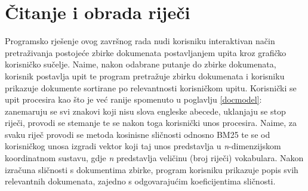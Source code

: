 \documentclass[times, utf8, zavrsni]{fer}
\begin{document}
\section{Čitanje i obrada riječi}
Programsko rješenje ovog završnog rada nudi korisniku interaktivan način pretraživanja postojeće zbirke dokumenata postavljanjem upita kroz grafičko korisničko sučelje. Naime, nakon odabrane putanje do zbirke dokumenata, korisnik postavlja upit te program pretražuje zbirku dokumenata i korisniku prikazuje dokumente sortirane po relevantnosti korisničkom upitu.
Korisnički se upit procesira kao što je već ranije spomenuto u poglavlju \ref{docmodel}: zanemaruju se svi znakovi koji nisu slova engleske abecede, uklanjaju se stop riječi, provodi se stemanje te se nakon toga korisnički unos procesira. Naime, za svaku riječ provodi se metoda kosinisne sličnosti odnosno BM25 te se od korisničkog unosa izgradi vektor koji taj unos predstavlja u \textit{n}-dimenzijskom koordinatnom sustavu, gdje \textit{n} predstavlja veličinu (broj riječi) vokabulara. Nakon izračuna sličnosti s dokumentima zbirke, program korisniku prikazuje popis svih relevantnih dokumenata, zajedno s odgovarajućim koeficijentima sličnosti.
\end{document}
